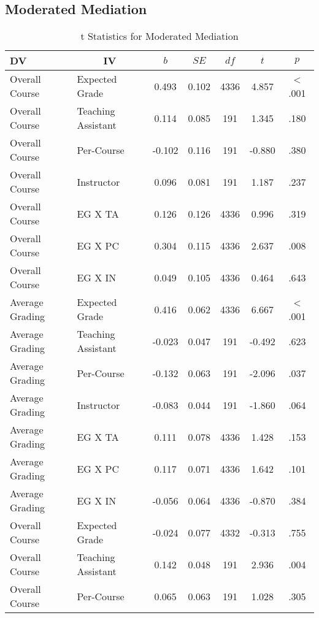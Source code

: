 \documentclass[man]{apa6}
\theoremstyle{definition}
\theoremstyle{definition}
\theoremstyle{definition}
\theoremstyle{remark}
\begin{document}
\subsection{Moderated Mediation}\label{moderated-mediation}

\begin{table}[tbp]
\begin{center}
\begin{threeparttable}
\caption{\label{tab:table-mod-med}t Statistics for Moderated Mediation}
\begin{tabular}{llccccc}
\toprule
DV & \multicolumn{1}{c}{IV} & \multicolumn{1}{c}{$b$} & \multicolumn{1}{c}{$SE$} & \multicolumn{1}{c}{$df$} & \multicolumn{1}{c}{$t$} & \multicolumn{1}{c}{$p$}\\
\midrule
Overall Course & Expected Grade & 0.493 & 0.102 & 4336 & 4.857 & < .001\\
Overall Course & Teaching Assistant & 0.114 & 0.085 & 191 & 1.345 & .180\\
Overall Course & Per-Course & -0.102 & 0.116 & 191 & -0.880 & .380\\
Overall Course & Instructor & 0.096 & 0.081 & 191 & 1.187 & .237\\
Overall Course & EG X TA & 0.126 & 0.126 & 4336 & 0.996 & .319\\
Overall Course & EG X PC & 0.304 & 0.115 & 4336 & 2.637 & .008\\
Overall Course & EG X IN & 0.049 & 0.105 & 4336 & 0.464 & .643\\
Average Grading & Expected Grade & 0.416 & 0.062 & 4336 & 6.667 & < .001\\
Average Grading & Teaching Assistant & -0.023 & 0.047 & 191 & -0.492 & .623\\
Average Grading & Per-Course & -0.132 & 0.063 & 191 & -2.096 & .037\\
Average Grading & Instructor & -0.083 & 0.044 & 191 & -1.860 & .064\\
Average Grading & EG X TA & 0.111 & 0.078 & 4336 & 1.428 & .153\\
Average Grading & EG X PC & 0.117 & 0.071 & 4336 & 1.642 & .101\\
Average Grading & EG X IN & -0.056 & 0.064 & 4336 & -0.870 & .384\\
Overall Course & Expected Grade & -0.024 & 0.077 & 4332 & -0.313 & .755\\
Overall Course & Teaching Assistant & 0.142 & 0.048 & 191 & 2.936 & .004\\
Overall Course & Per-Course & 0.065 & 0.063 & 191 & 1.028 & .305\\

\end{tabular}
\end{threeparttable}
\end{center}
\end{table}
\end{document}
